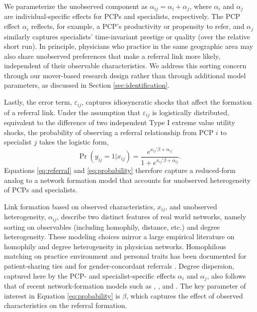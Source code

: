 \documentclass[12pt]{article}
\begin{document}
We parameterize the unobserved component as $\alpha_{ij} = \alpha_{i} + \alpha_{j}$, where $\alpha_{i}$ and $\alpha_{j}$ are individual-specific effects for PCPs and specialists, respectively. The PCP effect $\alpha_{i}$ reflects, for example, a PCP's productivity or propensity to refer, and $\alpha_{j}$ similarly captures specialists' time-invariant prestige or quality (over the relative short run). In principle, physicians who practice in the same geographic area may also share unobserved preferences that make a referral link more likely, independent of their observable characteristics. We address this sorting concern through our mover-based research design rather than through additional model parameters, as discussed in Section \ref{sec:identification}.

Lastly, the error term, $\varepsilon_{ij}$, captures idiosyncratic shocks that affect the formation of a referral link. Under the assumption that $\varepsilon_{ij}$ is logistically distributed, equivalent to the difference of two independent Type I extreme value utility shocks, the probability of observing a referral relationship from PCP $i$ to specialist $j$ takes the logistic form,
\begin{equation}\label{eq:probability}
    \operatorname{Pr}(y_{ij} = 1 | x_{ij}) = \frac{e^{x_{ij}'\beta + \alpha_{ij}}}{1 + e^{x_{ij}'\beta + \alpha_{ij}}}.
\end{equation}
Equations \eqref{eq:referral} and \eqref{eq:probability} therefore capture a reduced-form analog to a network formation model that accounts for unobserved heterogeneity of PCPs and specialists.

Link formation based on observed characteristics, $x_{ij}$, and unobserved heterogeneity, $\alpha_{ij}$, describe two distinct features of real world networks, namely sorting on observables (including homophily, distance, etc.) and degree heterogeneity. These modeling choices mirror a large empirical literature on homophily and degree heterogeneity in physician networks. Homophilous matching on practice environment and personal traits has been documented for patient-sharing ties \citep{barnett2012mc,landon_using_2013} and for gender-concordant referrals \citep{zeltzer2020,sarsons2023}. Degree dispersion, captured here by the PCP- and specialist-specific effects $\alpha_i$ and $\alpha_j$, also follows that of recent network-formation models such as \cite{jackson2007}, \cite{graham_econometric_2017}, and \cite{dzemski2019}. The key parameter of interest in Equation \ref{eq:probability} is $\beta$, which captures the effect of observed characteristics on the referral formation.
\end{document}
